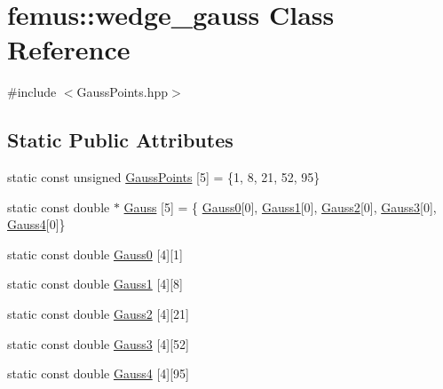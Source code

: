 \hypertarget{classfemus_1_1wedge__gauss}{}\section{femus\+:\+:wedge\+\_\+gauss Class Reference}
\label{classfemus_1_1wedge__gauss}


{\ttfamily \#include $<$Gauss\+Points.\+hpp$>$}

\subsection*{Static Public Attributes}
\begin{DoxyCompactItemize}
\item 
static const unsigned \mbox{\hyperlink{classfemus_1_1wedge__gauss_a7e55f855f87c5e6b4a50273eef1dad8e}{Gauss\+Points}} \mbox{[}5\mbox{]} = \{1, 8, 21, 52, 95\}
\item 
static const double $\ast$ \mbox{\hyperlink{classfemus_1_1wedge__gauss_a14e9aad467413752cfa48ae00b14e14e}{Gauss}} \mbox{[}5\mbox{]} = \{ \mbox{\hyperlink{classfemus_1_1wedge__gauss_a653a7e044d72300650adffcbf08128e6}{Gauss0}}\mbox{[}0\mbox{]}, \mbox{\hyperlink{classfemus_1_1wedge__gauss_adf988cd0b689da6fbd93a35353d42f6c}{Gauss1}}\mbox{[}0\mbox{]}, \mbox{\hyperlink{classfemus_1_1wedge__gauss_a933b0be3c70f8720ef2bf30150199769}{Gauss2}}\mbox{[}0\mbox{]}, \mbox{\hyperlink{classfemus_1_1wedge__gauss_ac2d1c542cde6a0e3ba11113234b7e511}{Gauss3}}\mbox{[}0\mbox{]}, \mbox{\hyperlink{classfemus_1_1wedge__gauss_a3d933a8ba8b6d4f1a629787a468eddf8}{Gauss4}}\mbox{[}0\mbox{]}\}
\item 
static const double \mbox{\hyperlink{classfemus_1_1wedge__gauss_a653a7e044d72300650adffcbf08128e6}{Gauss0}} \mbox{[}4\mbox{]}\mbox{[}1\mbox{]}
\item 
static const double \mbox{\hyperlink{classfemus_1_1wedge__gauss_adf988cd0b689da6fbd93a35353d42f6c}{Gauss1}} \mbox{[}4\mbox{]}\mbox{[}8\mbox{]}
\item 
static const double \mbox{\hyperlink{classfemus_1_1wedge__gauss_a933b0be3c70f8720ef2bf30150199769}{Gauss2}} \mbox{[}4\mbox{]}\mbox{[}21\mbox{]}
\item 
static const double \mbox{\hyperlink{classfemus_1_1wedge__gauss_ac2d1c542cde6a0e3ba11113234b7e511}{Gauss3}} \mbox{[}4\mbox{]}\mbox{[}52\mbox{]}
\item 
static const double \mbox{\hyperlink{classfemus_1_1wedge__gauss_a3d933a8ba8b6d4f1a629787a468eddf8}{Gauss4}} \mbox{[}4\mbox{]}\mbox{[}95\mbox{]}
\end{DoxyCompactItemize}


